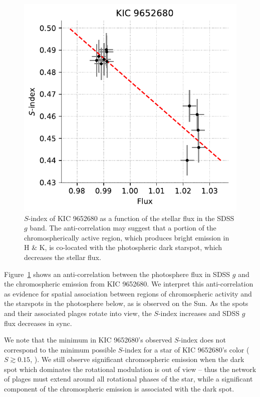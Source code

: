 \begin{figure}
\centering
    \includegraphics[scale=0.7]{nephelion/kic_sindex_vs_flux.pdf}
    \caption{$S$-index of KIC 9652680 as a function of the stellar flux in the SDSS $g$ band. The anti-correlation may suggest that a portion of the chromospherically active region, which produces bright emission in  H \& K, is co-located with the photospheric dark starspot, which decreases the stellar flux.}
    \label{fig:sind_corr_kic}
\end{figure}

Figure~\ref{fig:sind_corr_kic} shows an anti-correlation between the photosphere flux in SDSS $g$ and the chromospheric emission from KIC 9652680. We interpret this anti-correlation as evidence for spatial association between regions of chromospheric activity and the starspots in the photosphere below, as is observed on the Sun. As the spots and their associated plages rotate into view, the $S$-index increases and SDSS $g$ flux decreases in sync.

We note that the minimum in KIC 9652680's observed $S$-index does not correspond to the minimum possible $S$-index for a star of KIC 9652680's color ($S\gtrsim 0.15$, \citealt[see e.g.][]{Isaacson2010}). We still observe significant chromospheric emission when the dark spot which dominates the rotational modulation is out of view -- thus the network of plages must extend around all rotational phases of the star, while a significant component of the chromospheric emission is associated with the dark spot.

